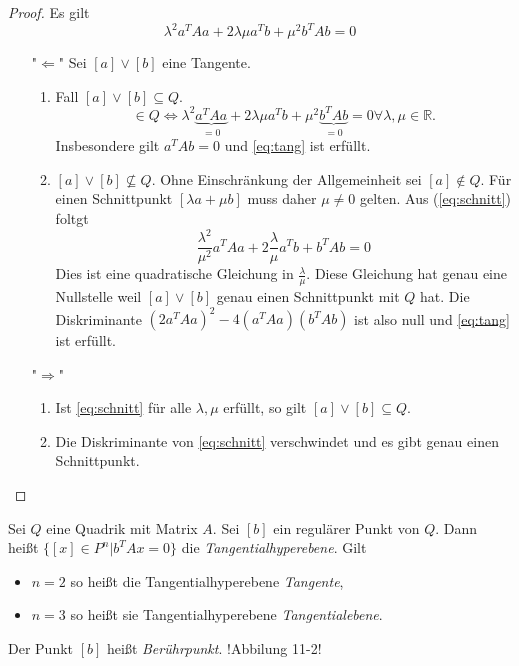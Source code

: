 \documentclass[11pt]{article}
\begin{document}
\begin{proof}
Es gilt \begin{equation}\label{eq:schnitt}
    \lambda^2a^TAa + 2\lambda\mu a^Tb + \mu^2b^TAb= 0
\end{equation}
\begin{itemize}
    \item["$\Leftarrow$"] Sei $[a]\lor[b]$ eine Tangente. 
        \begin{enumerate}
            \item Fall $[a]\lor[b]\subseteq Q$. 
            \begin{equation*}
                [\lambda a +  \mu b]\in Q \Leftrightarrow \lambda^2\underbrace{a^TAa}_{=0} + 2\lambda\mu a^Tb + \mu^2\underbrace{b^TAb}_{=0} = 0 \forall \lambda,\mu \in \mathbb R.
            \end{equation*}
            Insbesondere gilt $a^TAb = 0$ und \eqref{eq:tang} ist erfüllt.
            \item $[a]\lor[b]\not\subseteq Q$. Ohne Einschränkung der Allgemeinheit sei $[a]\notin Q$. Für einen Schnittpunkt $[\lambda a + \mu b]$ muss daher $\mu\neq 0$ gelten. Aus (\ref{eq:schnitt}) foltgt \begin{equation*}
                \frac{\lambda^2}{\mu^2}a^TAa + 2\frac\lambda\mu a^Tb + b^TAb= 0
            \end{equation*}
            Dies ist eine quadratische Gleichung in $\frac\lambda\mu$. Diese Gleichung hat genau eine Nullstelle weil $[a]\lor[b]$ genau einen Schnittpunkt mit $Q$ hat. Die Diskriminante $(2a^TAa)^2-4(a^TAa)(b^TAb)$ ist also null und \eqref{eq:tang} ist erfüllt.
        \end{enumerate}
    \item["$\Rightarrow$"]
        \begin{enumerate}
            \item Ist \eqref{eq:schnitt} für alle $\lambda,\mu$ erfüllt, so gilt $[a]\lor[b]\subseteq Q$.
            \item Die Diskriminante von \eqref{eq:schnitt} verschwindet und es gibt genau einen Schnittpunkt.
        \end{enumerate}
\end{itemize}
\end{proof}

\begin{definition}
Sei $Q$ eine Quadrik mit Matrix $A$. Sei $[b]$ ein regulärer Punkt von $Q$. Dann heißt $\{[x]\in P^n| b^TAx = 0\}$ die \textit{Tangentialhyperebene}. Gilt \begin{itemize}
    \item $n=2$ so heißt die Tangentialhyperebene \textit{Tangente},
    \item $n=3$ so heißt sie Tangentialhyperebene \textit{Tangentialebene}.
\end{itemize}
Der Punkt $[b]$ heißt \textit{Berührpunkt}.
!Abbilung 11-2!
\end{definition}
\end{document}
